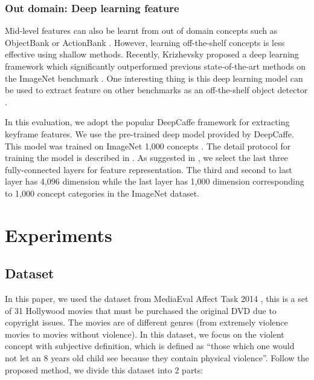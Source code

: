 \documentclass[twocolumn]{bmcart}%
\begin{document}
\subsubsection{Out domain: Deep learning feature}
Mid-level features can also be learnt from out of domain concepts such as ObjectBank \cite{15} or ActionBank \cite{23}. However, learning off-the-shelf concepts is less effective using shallow methods. Recently, Krizhevsky \cite{krizhevsky2012imagenet} proposed a deep learning framework which significantly outperformed previous state-of-the-art methods on the ImageNet benchmark \cite{deng2009imagenet}. One interesting thing is this deep learning model can be used to extract feature on other benchmarks as an off-the-shelf object detector \cite{donahue2013decaf}. 

In this evaluation, we adopt the popular DeepCaffe \cite{jia2014caffe} framework for extracting keyframe features. We use the pre-trained deep model provided by DeepCaffe. This model was trained on ImageNet 1,000 concepts \cite{deng2009imagenet}. The detail protocol for training the model is described in \cite{jia2014caffe}. As suggested in \cite{krizhevsky2012imagenet}, we select the last three fully-connected layers for feature representation. The third and second to last layer has 4,096 dimension while the last layer has 1,000 dimension corresponding to 1,000 concept categories in the ImageNet dataset.

\section{Experiments}
\subsection{Dataset}
In this paper, we used the dataset from MediaEval  Affect Task 2014 \cite{demarty2014benchmarking}, this is a set of 31 Hollywood movies that must be purchased the original DVD due to copyright issues. The movies are of different genres (from extremely violence movies to movies without violence). In this dataset, we focus on the violent concept with subjective definition, which is defined as “those which one would not let an 8 years old child see because they contain physical violence”. Follow the proposed method, we divide this dataset into 2 parts:
\end{document}
